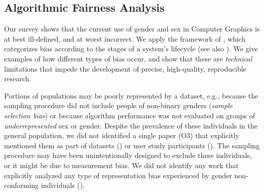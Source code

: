 \documentclass[sigconf,balance=false]{acmart}
\begin{document}
\subsection{Algorithmic Fairness Analysis}\label{sec:analysis}

Our survey shows that the current use of gender and sex in Computer Graphics is at best ill-defined, and at worst incorrect.
We apply the framework of \citet{Suresh2021}, which categorizes bias according to the stages of a system's lifecycle 
(see also \cite{fairnesssurvey,FriedmanAndNissenbaum,olteanu2019social}).
We give examples of how different types of bias occur, and show that these are \emph{technical} limitations that impede the development of precise, high-quality, reproducible research.

 Portions of populations may be poorly represented by a dataset, e.g., because the sampling procedure did not include people of non-binary genders (\emph{sample selection bias}) or because algorithm performance was not evaluated on groups of \emph{underrepresented} sex or gender. Despite the prevalence of these individuals in the general population, we did not identified a single paper (O3) that explicitly mentioned them as part of datasets (\dataset) or user study participants (\userstudy). The sampling procedure may have been unintentionally designed to exclude these individuals, or it might be due to measurement bias. We did not identify any work that explicitly analyzed any type of representation bias experienced by gender non-conforming individuals (\binary).
\end{document}
